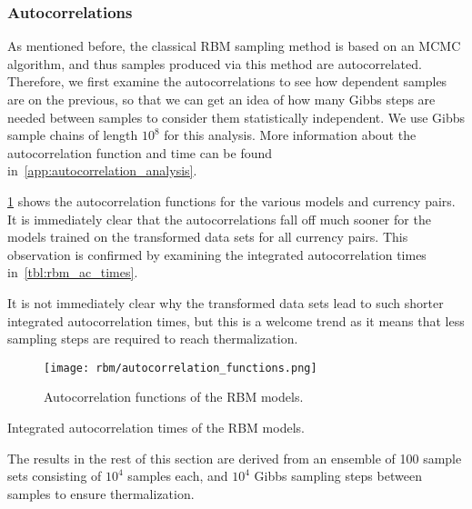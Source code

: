 \subsubsection{Autocorrelations}
As mentioned before, the classical RBM sampling method is based on an MCMC algorithm, and thus samples produced via this method are autocorrelated.
Therefore, we first examine the autocorrelations to see how dependent samples are on the previous, so that we can get an idea of how many Gibbs steps are needed between samples to consider them statistically independent.
We use Gibbs sample chains of length \( 10^8 \) for this analysis.
More information about the autocorrelation function and time can be found in~\cref{app:autocorrelation_analysis}.

\cref{fig:rbm_autocorrelation_functions} shows the autocorrelation functions for the various models and currency pairs.
It is immediately clear that the autocorrelations fall off much sooner for the models trained on the transformed data sets for all currency pairs.
This observation is confirmed by examining the integrated autocorrelation times in~\cref{tbl:rbm_ac_times}.

It is not immediately clear why the transformed data sets lead to such shorter integrated autocorrelation times, but this is a welcome trend as it means that less sampling steps are required to reach thermalization.
\begin{figure}[!htb]
    \begin{center}
        \texttt{[image: rbm/autocorrelation\_functions.png]}
    \end{center}
    \caption{
        Autocorrelation functions of the RBM models.
    }
    \label{fig:rbm_autocorrelation_functions}
\end{figure}
\begin{table}[!htb]
    \centering
    \begin{adjustbox}{max width=\textwidth}
        
    \end{adjustbox}
    \caption{
        Integrated autocorrelation times of the RBM models.
    }
    \label{tbl:rbm_ac_times}
\end{table}

The results in the rest of this section are derived from an ensemble of 100 sample sets consisting of \( 10^4 \) samples each, and \( 10^4 \) Gibbs sampling steps between samples to ensure thermalization.

